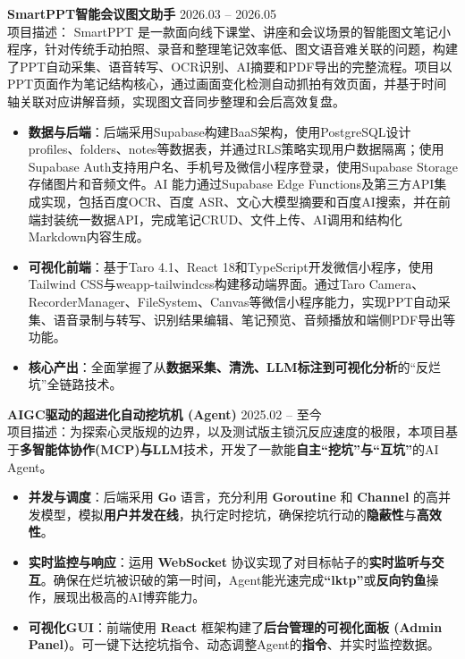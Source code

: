 \documentclass[11pt]{article}
\newlength{\interProjectSpacing}
\newcommand{\projectsep}{\vspace{\interProjectSpacing}}
\newlength{\intraProjectTitleSep}
\newcommand{\titlebreak}{\\[\intraProjectTitleSep]}
\newlength{\intraProjectListTopSep}
\begin{document}
\textbf{SmartPPT智能会议图文助手} \hfill 2026.03 -- 2026.05 \titlebreak
项目描述： SmartPPT 是一款面向线下课堂、讲座和会议场景的智能图文笔记小程序，针对传统手动拍照、录音和整理笔记效率低、图文语音难关联的问题，构建了PPT自动采集、语音转写、OCR识别、AI摘要和PDF导出的完整流程。项目以PPT页面作为笔记结构核心，通过画面变化检测自动抓拍有效页面，并基于时间轴关联对应讲解音频，实现图文音同步整理和会后高效复盘。
\begin{itemize}[nosep, topsep=\intraProjectListTopSep]
    \item \textbf{数据与后端}：后端采用Supabase构建BaaS架构，使用PostgreSQL设计profiles、folders、notes等数据表，并通过RLS策略实现用户数据隔离；使用Supabase Auth支持用户名、手机号及微信小程序登录，使用Supabase Storage存储图片和音频文件。AI 能力通过Supabase Edge Functions及第三方API集成实现，包括百度OCR、百度 ASR、文心大模型摘要和百度AI搜索，并在前端封装统一数据API，完成笔记CRUD、文件上传、AI调用和结构化Markdown内容生成。
    \item \textbf{可视化前端}：基于Taro 4.1、React 18和TypeScript开发微信小程序，使用Tailwind CSS与weapp-tailwindcss构建移动端界面。通过Taro Camera、RecorderManager、FileSystem、Canvas等微信小程序能力，实现PPT自动采集、语音录制与转写、识别结果编辑、笔记预览、音频播放和端侧PDF导出等功能。
    \item \textbf{核心产出}：全面掌握了从\textbf{数据采集、清洗、LLM标注到可视化分析}的“反烂坑”全链路技术。
\end{itemize}

\projectsep

\textbf{AIGC驱动的超进化自动挖坑机 (Agent)} \hfill 2025.02 -- 至今 \titlebreak
项目描述：为探索心灵版规的边界，以及测试版主锁沉反应速度的极限，本项目基于\textbf{多智能体协作(MCP)与LLM}技术，开发了一款能\textbf{自主“挖坑”与“互坑”}的AI Agent。
\begin{itemize}[nosep, topsep=\intraProjectListTopSep]
    \item \textbf{并发与调度}：后端采用 \textbf{Go} 语言，充分利用 \textbf{Goroutine} 和 \textbf{Channel} 的高并发模型，模拟\textbf{用户并发在线}，执行定时挖坑，确保挖坑行动的\textbf{隐蔽性}与\textbf{高效性}。
    \item \textbf{实时监控与响应}：运用 \textbf{WebSocket} 协议实现了对目标帖子的\textbf{实时监听与交互}。确保在烂坑被识破的第一时间，Agent能光速完成\textbf{“lktp”}或\textbf{反向钓鱼}操作，展现出极高的AI博弈能力。
    \item \textbf{可视化GUI}：前端使用 \textbf{React} 框架构建了\textbf{后台管理的可视化面板 (Admin Panel)}。可一键下达挖坑指令、动态调整Agent的\textbf{指令}、并实时监控数据。
\end{itemize}
\end{document}

